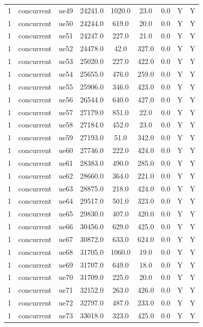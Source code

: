 \begin{table}[ht]
\begin{tabular}{|c|c|c|c|c|c|c|c|c|}
1 & concurrent & ue49 & 24241.0 & 1020.0 & 23.0 & 0.0 & Y & Y \\
1 & concurrent & ue50 & 24244.0 & 619.0 & 20.0 & 0.0 & Y & Y \\
1 & concurrent & ue51 & 24247.0 & 227.0 & 21.0 & 0.0 & Y & Y \\
1 & concurrent & ue52 & 24478.0 & 42.0 & 327.0 & 0.0 & Y & Y \\
1 & concurrent & ue53 & 25020.0 & 227.0 & 422.0 & 0.0 & Y & Y \\
1 & concurrent & ue54 & 25655.0 & 476.0 & 259.0 & 0.0 & Y & Y \\
1 & concurrent & ue55 & 25906.0 & 346.0 & 423.0 & 0.0 & Y & Y \\
1 & concurrent & ue56 & 26544.0 & 640.0 & 427.0 & 0.0 & Y & Y \\
1 & concurrent & ue57 & 27179.0 & 851.0 & 22.0 & 0.0 & Y & Y \\
1 & concurrent & ue58 & 27184.0 & 452.0 & 23.0 & 0.0 & Y & Y \\
1 & concurrent & ue59 & 27193.0 & 51.0 & 342.0 & 0.0 & Y & Y \\
1 & concurrent & ue60 & 27746.0 & 222.0 & 424.0 & 0.0 & Y & Y \\
1 & concurrent & ue61 & 28383.0 & 490.0 & 285.0 & 0.0 & Y & Y \\
1 & concurrent & ue62 & 28660.0 & 364.0 & 221.0 & 0.0 & Y & Y \\
1 & concurrent & ue63 & 28875.0 & 218.0 & 424.0 & 0.0 & Y & Y \\
1 & concurrent & ue64 & 29517.0 & 501.0 & 323.0 & 0.0 & Y & Y \\
1 & concurrent & ue65 & 29830.0 & 407.0 & 420.0 & 0.0 & Y & Y \\
1 & concurrent & ue66 & 30456.0 & 629.0 & 425.0 & 0.0 & Y & Y \\
1 & concurrent & ue67 & 30872.0 & 633.0 & 624.0 & 0.0 & Y & Y \\
1 & concurrent & ue68 & 31705.0 & 1060.0 & 19.0 & 0.0 & Y & Y \\
1 & concurrent & ue69 & 31707.0 & 649.0 & 18.0 & 0.0 & Y & Y \\
1 & concurrent & ue70 & 31709.0 & 225.0 & 20.0 & 0.0 & Y & Y \\
1 & concurrent & ue71 & 32152.0 & 263.0 & 426.0 & 0.0 & Y & Y \\
1 & concurrent & ue72 & 32797.0 & 487.0 & 233.0 & 0.0 & Y & Y \\
1 & concurrent & ue73 & 33018.0 & 323.0 & 425.0 & 0.0 & Y & Y \\

\end{tabular}
\end{table}
